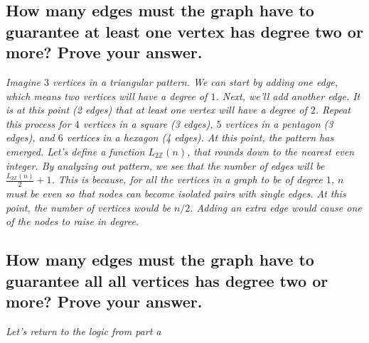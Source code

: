 \documentclass{article}
\begin{document}
\subsection{How many edges must the graph have to guarantee at least one vertex has degree
    two or more? Prove your answer.}
\hspace{1cm}\textit{Imagine $3$ vertices in a triangular pattern. We can start by adding one
    edge, which means two vertices will have a degree of $1$. Next, we'll add another edge. It
    is at this point (2 edges) that at least one vertex will have a degree of $2$. Repeat this process for
    $4$ vertices in a square (3 edges), $5$ vertices in a pentagon (3 edges), and $6$ vertices in
    a hexagon (4 edges). At this point, the pattern has emerged. Let's define a function $L_{2\mathbb{Z}}(n)$,
    that rounds down to the nearest even integer. By analyzing out pattern, we see that the number of edges
    will be $\frac{L_{2\mathbb{Z}}(n)}{2}+1$. This is because, for all the vertices in a graph to be of degree $1$,
    $n$ must be even so that nodes can become isolated pairs with single edges. At this point, the number of
    vertices would be $n/2$. Adding an extra edge would cause one of the nodes to raise in degree.}
\subsection{How many edges must the graph have to guarantee all all vertices has degree
    two or more? Prove your answer.}
\hspace{1cm}\textit{Let's return to the logic from part a}
\end{document}

